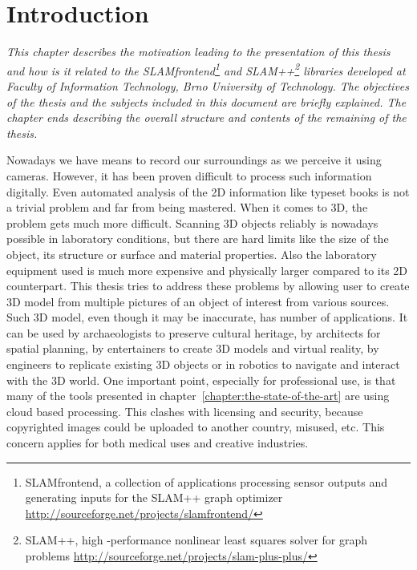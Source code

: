 \makeatletter
\renewcommand*\env@matrix[1][*\c@MaxMatrixCols c]{%
  \hskip -\arraycolsep
  \let\@ifnextchar\new@ifnextchar
  \array{#1}}
\makeatother

\newcommand{\footlabel}[2]{%
    \addtocounter{footnote}{1}%
    \footnotetext[\thefootnote]{%
        \addtocounter{footnote}{-1}%
       ~\refstepcounter{footnote}\label{#1}%
        #2%
    }%
    $^{\ref{#1}}$%
}

\newcommand{\footref}[1]{%
    $^{\ref{#1}}$%
}

\chapter{Introduction}
\label{chapter:introduction}
\textit{This chapter describes the motivation leading to the presentation of this thesis and how is it related to the SLAM\textunderscore frontend\footnote{SLAM\textunderscore frontend, a collection of applications processing sensor outputs and generating inputs for the SLAM++ graph optimizer \url{http://sourceforge.net/projects/slamfrontend/}} and SLAM++\footnote{SLAM++, high -performance nonlinear least squares solver for graph problems \url{http://sourceforge.net/projects/slam-plus-plus/}} libraries developed at Faculty of Information Technology, Brno University of Technology. The objectives of the thesis and the subjects included in this document are briefly explained. The chapter ends describing the overall structure and contents of the remaining of the thesis.}

\vspace{.5cm}
Nowadays we have means to record our surroundings as we perceive it using cameras. However, it has been proven difficult to process such information digitally. Even automated analysis of the 2D information like typeset books is not a trivial problem and far from being mastered. When it comes to 3D, the problem gets much more difficult. Scanning 3D objects reliably is nowadays possible in laboratory conditions, but there are hard limits like the size of the object, its structure or surface and material properties. Also the laboratory equipment used is much more expensive and physically larger compared to its 2D counterpart. This thesis tries to address these problems by allowing user to create 3D model from multiple pictures of an object of interest from various sources. Such 3D model, even though it may be inaccurate, has number of applications. It can be used by archaeologists to preserve cultural heritage, by architects for spatial planning, by entertainers to create 3D models and virtual reality, by engineers to replicate existing 3D objects or in robotics to navigate and interact with the 3D world. One important point, especially for professional use, is that many of the tools presented in chapter~\ref{chapter:the-state-of-the-art} are using cloud based processing. This clashes with licensing and security, because copyrighted images could be uploaded to another country, misused, etc. This concern applies for both medical uses and creative industries.


